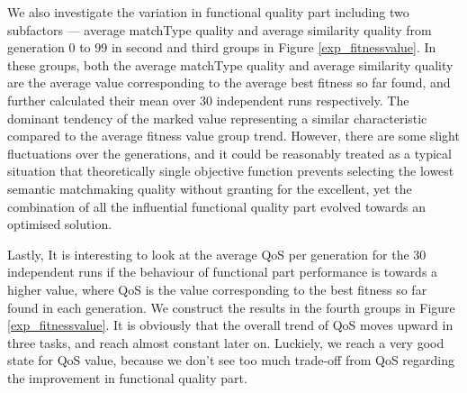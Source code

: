 \documentclass{llncs}
\begin{document}
We also investigate the variation in functional quality part including two subfactors --- average matchType quality and average similarity quality from generation 0 to 99 in second and third groups in Figure \ref{exp_fitnessvalue}.  In these groups,  both the average matchType quality and average similarity quality are the average value corresponding to the average best fitness so far found,  and further calculated their mean over 30 independent runs respectively. The dominant tendency of the marked value representing a similar characteristic compared to the average fitness value group trend. However, there are some slight fluctuations over the generations, and it could be reasonably treated as a typical situation that theoretically single objective function prevents selecting the lowest semantic matchmaking quality without granting for the excellent, yet the combination of all the influential functional quality part evolved towards an optimised solution.

Lastly, It is interesting to look at the average QoS per generation for the 30 independent runs if the behaviour of functional part performance is towards a higher value, where QoS is the value corresponding to the best fitness so far found in each generation. We construct the results in the fourth groups in Figure \ref{exp_fitnessvalue}. It is obviously that the overall trend of QoS moves upward in three tasks, and reach almost constant later on. Luckiely, we reach a very good state for QoS value, because we don't see too much trade-off from QoS regarding the improvement in functional quality part. 
\end{document}

